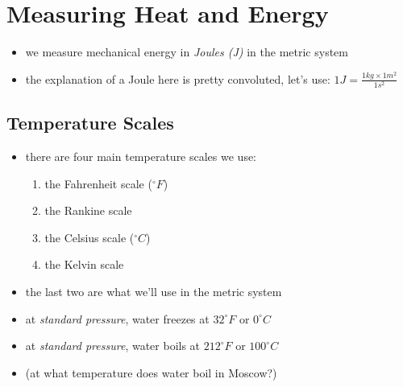 \documentclass[11pt, oneside]{article}   	%
\begin{document}
\section{Measuring Heat and Energy}
\begin{itemize}
\item we measure mechanical energy in \emph{Joules (J)} in the metric system
\item the explanation of a Joule here is pretty convoluted, let's use: $1J = \frac{1kg \times 1 m^{2}}{1 s^{2}}$
\end{itemize}

\subsection{Temperature Scales}
\begin{itemize}
\item there are four main temperature scales we use:
\begin{enumerate}
\item the Fahrenheit scale ($^{\circ} F$)
\item the Rankine scale
\item the Celsius scale ($^{\circ} C$)
\item the Kelvin scale
\end{enumerate}
\item the last two are what we'll use in the metric system
\item at \emph{standard pressure}, water freezes at $32^{\circ} F$ or $0^{\circ} C$
\item at \emph{standard pressure}, water boils at $212^{\circ} F$ or $100^{\circ} C$ 
\item (at what temperature does water boil in Moscow?)
\end{itemize}
\end{document}
